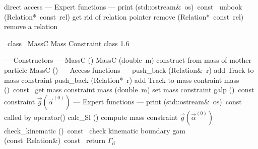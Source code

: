 \documentclass{article}
\begin{document}
\begin{cxxentry}
\begin{cxxclass}
\begin{cxxpublic}
        { direct access}
        {}
\label{cxx.1.5.19}
\cxxitem{}
        {--- Expert functions --- }
        {}
        {}
        {}
\label{cxx.1.5.20}
        {print}
        {(std::ostream\&\ os)\ const\ }
        {}
        {}
\label{cxx.1.5.21}
        {unbook}
        {(Relation*\ const\ rel)}
        { get rid of relation pointer}
        {}
\label{cxx.1.5.22}
        {remove}
        {(Relation*\ const\ rel)}
        { remove a relation}
        {}
\label{cxx.1.5.23}
\end{cxxpublic}
\end{cxxclass}
\begin{cxxclass}
{\ class\ }
        {MassC}
        {}
        {Mass Constraint class }
        {1.6}
\begin{cxxpublic}
\cxxitem{}
        {--- Constructors --- }
        {}
        {}
        {}
\label{cxx.1.6.1}
\cxxitem{}
        {MassC}
        {()}
        {}
        {}
\label{cxx.1.6.2}
\cxxitem{}
        {MassC}
        {(double\ m)}
        { construct from mass of mother particle}
        {}
\label{cxx.1.6.3}
\cxxitem{}
        {\cxxtilde MassC}
        {()}
        {}
        {}
\label{cxx.1.6.4}
\cxxitem{}
        {--- Access functions --- }
        {}
        {}
        {}
\label{cxx.1.6.5}
        {push\_back}
        {(Relation\&\ r)}
        { add Track to mass constraint}
        {}
\label{cxx.1.6.6}
        {push\_back}
        {(Relation*\ r)}
        { add Track to mass contraint}
        {}
\label{cxx.1.6.7}
        {mass}
        {()\ const\ }
        { get mass constraint}
        {}
\label{cxx.1.6.8}
        {mass}
        {(double\ m)}
        { set mass constraint}
        {}
\label{cxx.1.6.9}
        {galp}
        {()\ const\ }
        { constraint $\vec{g}(\vec{\alpha}^{(0)})$}
        {}
\label{cxx.1.6.10}
\cxxitem{}
        {--- Expert functions --- }
        {}
        {}
        {}
\label{cxx.1.6.11}
        {print}
        {(std::ostream\&\ os)\ const\ }
        { called by operator\<\<()}
        {}
\label{cxx.1.6.12}
        {calc\_Sl}
        {()}
        { compute mass constraint $\vec{g}(\vec{\alpha}^{(0)})$}
        {}
\label{cxx.1.6.13}
        {check\_kinematic}
        {()\ const\ }
        { check kinematic boundary}
        {}
\label{cxx.1.6.14}
        {gam}
        {(const\ Relation\&)\ const\ }
        { return $\Gamma_{li}$}
        {}
\label{cxx.1.6.15}
\end{cxxpublic}
\end{cxxclass}
\end{cxxentry}
\end{document}

